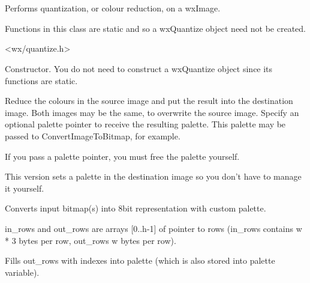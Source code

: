 \section{}\label{wxquantize}

Performs quantization, or colour reduction, on a wxImage.

Functions in this class are static and so a wxQuantize object need not be created.




<wx/quantize.h>


\label{wxquantizewxquantize}


Constructor. You do not need to construct a wxQuantize object since its functions are static.

\label{wxquantizequantize}


Reduce the colours in the source image and put the result into the
destination image. Both images may be the same, to overwrite the source image.
Specify an optional palette pointer to receive the resulting palette.
This palette may be passed to ConvertImageToBitmap, for example.

If you pass a palette pointer, you must free the palette yourself.


This version sets a palette in the destination image so you don't
have to manage it yourself.

\label{wxquantizedoquantize}


Converts input bitmap(s) into 8bit representation with custom palette.

in\_rows and out\_rows are arrays [0..h-1] of pointer to rows
(in\_rows contains w * 3 bytes per row, out\_rows w bytes per row).

Fills out\_rows with indexes into palette (which is also stored into palette variable).

